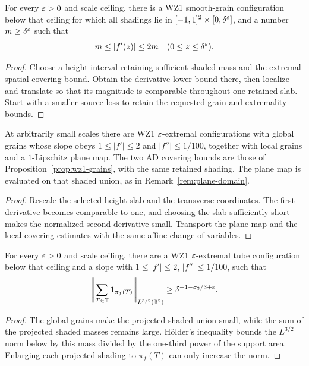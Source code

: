 \begin{lemma}
\label{lem:wz1-comparable-derivative}
For every $\varepsilon>0$ and scale ceiling, there is a WZ1 smooth-grain
configuration below that ceiling for which all shadings lie in
$[-1,1]^2\times[0,\delta^\varepsilon]$, and a number $m\geq\delta^\varepsilon$
such that
\[
             m\leq |f'(z)|\leq2m\quad(0\leq z\leq\delta^\varepsilon).
\]
\end{lemma}
\begin{proof}
Choose a height interval retaining sufficient shaded mass and the
extremal spatial covering bound. Obtain the derivative lower bound
there, then localize and translate so that its magnitude is comparable
throughout one retained slab. Start with a smaller source loss to
retain the requested grain and extremality bounds.
\end{proof}

\begin{proposition}
\label{prop:wz1-nonsingular}
At arbitrarily small scales there are WZ1 $\varepsilon$-extremal
configurations with global grains whose slope obeys
$1\leq|f'|\leq2$ and $|f''|\leq1/100$, together with local grains
and a $1$-Lipschitz plane map. The two AD covering bounds are those
of Proposition~\ref{prop:wz1-grains}, with the same retained shading.
The plane map is evaluated on that shaded union, as in
Remark~\ref{rem:plane-domain}.
\end{proposition}
\begin{proof}
Rescale the selected height slab and the transverse coordinates.
The first derivative becomes comparable to one, and choosing the
slab sufficiently short makes the normalized second derivative small.
Transport the plane map and the local covering estimates with the
same affine change of variables.
\end{proof}

\begin{corollary}
\label{cor:wz1-large-norm}
For every $\varepsilon>0$ and scale ceiling, there are a WZ1
$\varepsilon$-extremal tube configuration below that ceiling and a slope
with $1\leq|f'|\leq2$, $|f''|\leq1/100$, such that
\[
 \left\|\sum_{T\in\mathbb{T}}\mathbf{1}_{\pi_f(T)}\right\|_{L^{3/2}(\mathbb{R}^2)}
                         \geq\delta^{-1-\sigma_3/3+\varepsilon}.
\]
\end{corollary}
\begin{proof}
The global grains make the projected shaded union small, while the
sum of the projected shaded masses remains large. H\"older's
inequality bounds the $L^{3/2}$ norm below by this mass divided by
the one-third power of the support area. Enlarging each projected
shading to $\pi_f(T)$ can only increase the norm.
\end{proof}

